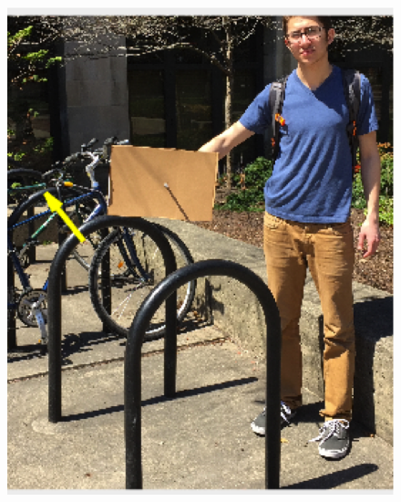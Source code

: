 \documentclass[10pt,twocolumn,letterpaper]{article}
\begin{document}
\begin{figure}[h]
\includegraphics[scale = 0.3]{zander.png}
\end{figure}
\end{document}
